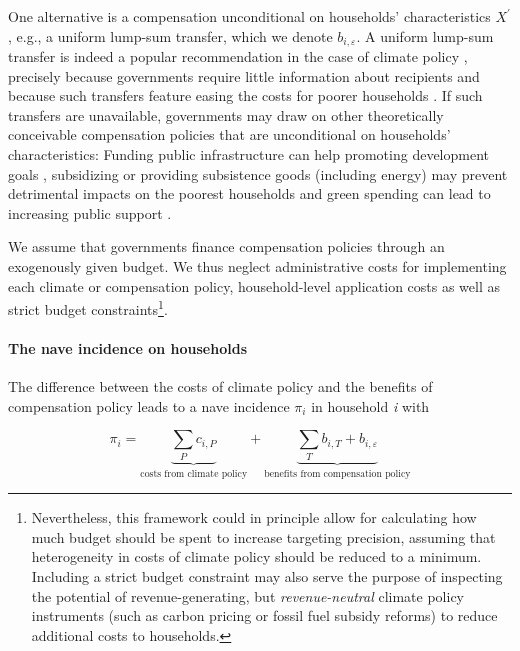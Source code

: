 \documentclass[12pt, a4paper]{article}
\begin{document}
One alternative is a compensation unconditional on households' characteristics $X^{\prime}$, e.g., a uniform lump-sum transfer, which we denote $b_{i,\varepsilon}$. A uniform lump-sum transfer is indeed a popular recommendation in the case of climate policy \autocite{Stiglitz.2017,Baranzini.2000,Metcalf.2009,Sager.2023}, precisely because governments require little information about recipients and because such transfers feature easing the costs for poorer households \autocite{Budolfson.2021,vanderPloeg.2022}. If such transfers are unavailable, governments may draw on other theoretically conceivable compensation policies that are unconditional on households' characteristics: Funding public infrastructure can help promoting development goals \autocite{Franks.2018,Jakob.2016}, subsidizing or providing subsistence goods (including energy) may prevent detrimental impacts on the poorest households \autocite{Greve.2022,Schaffitzel.2019} and green spending can lead to increasing public support \autocite{Sommer.2022,Kotchen.2017,Dechezlepretre.2022}.

We assume that governments finance compensation policies through an exogenously given budget. We thus neglect administrative costs for implementing each climate or compensation policy, household-level application costs as well as strict budget constraints\footnote{Nevertheless, this framework could in principle allow for calculating how much budget should be spent to increase targeting precision, assuming that heterogeneity in costs of climate policy should be reduced to a minimum. Including a strict budget constraint may also serve the purpose of inspecting the potential of revenue-generating, but \textit{revenue-neutral} climate policy instruments (such as carbon pricing or fossil fuel subsidy reforms) to reduce additional costs to households.}. 

\paragraph{The nave incidence on households}
The difference between the costs of climate policy and the benefits of compensation policy leads to a nave incidence $\pi_{i}$ in household \textit{i} with

\begin{equation} \label{eq:pi}
    \pi_{i} = \underbrace{\sum_{P} c_{i,P}}_{\text{costs from climate policy}} + \underbrace{\sum_{T} b_{i,T} + b_{i,\varepsilon}}_{\text{benefits from compensation policy}}
\end{equation}
\end{document}
